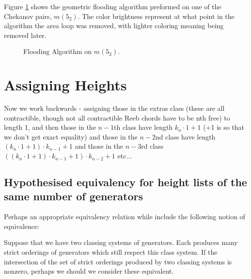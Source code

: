 \documentclass[11pt,oneside]{amsart}
\begin{document}
Figure \ref{fig:Flood} shows the geometric flooding algorithm preformed on one of the Chekanov pairs, $m(5_2)$. The color brightness represent at what point in the algorithm the area loop was removed, with lighter coloring meaning being removed later.


\begin{figure}[htbp]
  \label{fig:Flood}
  \centering
  
  \caption{Flooding Algorithm on $m(5_2)$.}
\end{figure}




\section{Assigning Heights}

Now we work backwards - assigning those in the extras class (these are all contractible, though not all contractible Reeb chords have to be nth free) to length 1, and then those in the $n-1$th class have length $k_n \cdot 1 + 1$ (+1 is so that we don't get exact equality) and those in the $n-2$nd class have length $ (k_n \cdot 1 + 1)\cdot k_{n-1} + 1$ and those in the $n-3$rd class $ ((k_n \cdot 1 + 1)\cdot k_{n-1} + 1)\cdot k_{n-2} + 1$ etc...




\subsection{Hypothesised equivalency for height lists of the same number of generators}

Perhaps an appropriate equivalency relation while include the following notion of equivalence:

Suppose that we have two classing systems of generators. Each produces many strict orderings of generators which still respect this class system. If the intersection of the set of strict orderings produced by two classing systems is nonzero, perhaps we should we consider these equivalent.
\end{document}
